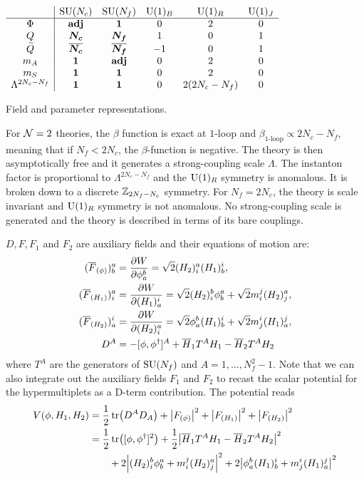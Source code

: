     \begin{table}[H]
        \centering
        $
        \begin{array}{c|ccccc}
            & \text{SU}(N_c) & \text{SU}(N_f) & \text{U}(1)_B & \text{U}(1)_R & \text{U}(1)_J \\ \hline
            \Phi & \textbf{adj} & \boldsymbol{1} & 0 & 2 & 0 \\
            Q & \boldsymbol{N_c} & \boldsymbol{N_f} & 1 & 0 & 1 \\
            \widetilde{Q} & \overline{\boldsymbol{N_c}} & \overline{\boldsymbol{N_f}} & -1 & 0 & 1 \\
            m_A & \boldsymbol{1} & \textbf{adj} & 0 & 2 & 0 \\
            m_S & \boldsymbol{1} & \boldsymbol{1} & 0 & 2 & 0 \\
            \Lambda^{2N_c-N_f} & \boldsymbol{1} & \boldsymbol{1} & 0 & 2(2N_c-N_f) & 0
        \end{array}
        $
        \caption{Field and parameter representations.}
        \label{table:fieldrepr}
    \end{table}

    For $\mathcal{N}=2$ theories, the $\beta$ function is exact at $1$-loop and $\beta_{1\text{-loop}}\propto 2N_c-N_f$, meaning that if $N_f<2N_c$, the $\beta$-function is negative. The theory is then asymptotically free and it generates a strong-coupling scale $\Lambda$. The instanton factor is proportional to $\Lambda^{2N_c-N_f}$ and the $\text{U}(1)_R$ symmetry is anomalous. It is broken down to a discrete $\mathbb{Z}_{2N_f-N_c}$ symmetry. For $N_f=2N_c$, the theory is scale invariant and $\text{U}(1)_R$ symmetry is not anomalous. No strong-coupling scale is generated and the theory is described in terms of its bare couplings.

    $D,F,F_1$ and $F_2$ are auxiliary fields and their equations of motion are:
    \begin{align}
        (\overline{F}_{(\phi)})^a_b &= \pdv{W}{\phi^b_a} = \sqrt{2}(H_2)^a_i (H_1)^i_b,\\
        (\overline{F}_{(H_1)})^a_i &= \pdv{W}{(H_{1})^i_a} = \sqrt{2}(H_2)^b_i\phi^a_b + \sqrt{2}m^j_i(H_2)^a_j,\\
        (\overline{F}_{(H_2)})^i_a &= \pdv{W}{(H_{2})^a_i} = \sqrt{2}\phi^b_a (H_1)^i_b + \sqrt{2}m^i_j(H_1)^j_a,\\
        D^A &= -[\phi,\phi^\dagger]^A + \overline{H}_1T^AH_1-\overline{H}_2T^AH_2
    \end{align}
    where $T^A$ are the generators of $\text{SU}(N_f)$ and $A=1,\dots,N^2_f-1$. Note that we can also integrate out the auxiliary fields $F_1$ and $F_2$ to recast the scalar potential for the hypermultiplets as a D-term contribution. The potential reads
    \begin{align}
        V(\phi,H_1,H_2) &= \frac{1}{2}\tr(D^AD_A)+\abs{F_{(\phi)}}^2+\abs{F_{(H_1)}}^2+\abs{F_{(H_2)}}^2\\
        &= \frac{1}{2}\tr([\phi,\phi^\dagger]^2)+\frac{1}{2}\abs{\overline{H}_1T^AH_1-\overline{H}_2T^AH_2}^2\\
        &\qquad+2\abs{(H_2)^b_i\phi^a_b+m^j_i(H_2)^a_j}^2+2\abs{\phi^b_a (H_1)^i_b+m^i_j(H_1)^j_a}^2
    \end{align}

